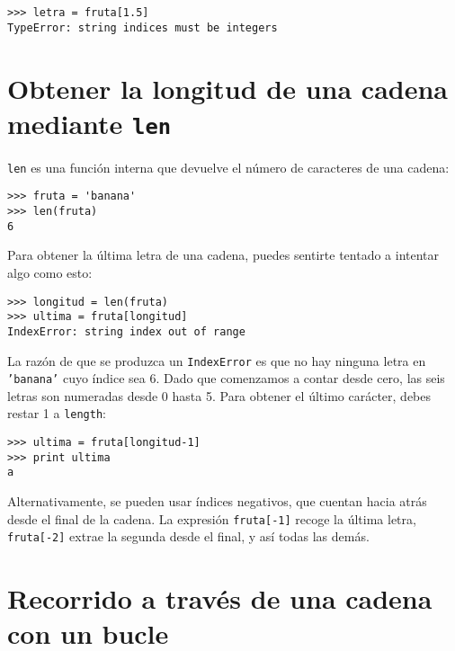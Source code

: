 
\beforeverb
\begin{verbatim}
>>> letra = fruta[1.5]
TypeError: string indices must be integers
\end{verbatim}
\afterverb
%

\section{Obtener la longitud de una cadena mediante {\tt len}}


{\tt len} es una función interna que devuelve el número de caracteres
de una cadena:

\beforeverb
\begin{verbatim}
>>> fruta = 'banana'
>>> len(fruta)
6
\end{verbatim}
\afterverb
%
Para obtener la última letra de una cadena, puedes sentirte tentado a intentar
algo como esto:


\beforeverb
\begin{verbatim}
>>> longitud = len(fruta)
>>> ultima = fruta[longitud]
IndexError: string index out of range
\end{verbatim}
\afterverb
%
La razón de que se produzca un {\tt IndexError} es que no hay ninguna letra
en {\tt 'banana'} cuyo índice sea 6. Dado que comenzamos a contar desde cero, las
seis letras son numeradas desde 0 hasta 5. Para obtener el último carácter, debes
restar 1 a {\tt length}:

\beforeverb
\begin{verbatim}
>>> ultima = fruta[longitud-1]
>>> print ultima
a
\end{verbatim}
\afterverb
%
Alternativamente, se pueden usar índices negativos, que cuentan hacia atrás desde
el final de la cadena. La expresión {\tt fruta[-1]} recoge la última
letra, {\tt fruta[-2]} extrae la segunda desde el final, y así todas las demás.



\section{Recorrido a través de una cadena con un bucle}
\label{for}


